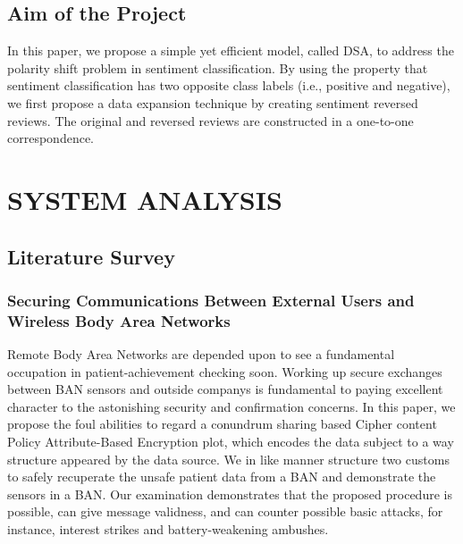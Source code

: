 \documentclass[BTech]{srmuthesis}
\begin{document}
\section{Aim of the Project}
In this paper, we propose a simple yet efficient model, called \ac{DSA}, to address the polarity shift problem in sentiment classification. By using the property that sentiment classification has two opposite class labels (i.e., positive and negative), we first propose a data expansion technique by creating sentiment reversed reviews. The original and reversed reviews are constructed in a one-to-one correspondence.







\chapter{SYSTEM ANALYSIS}

\section{Literature Survey}
\subsection{Securing Communications Between External Users and Wireless Body Area Networks}
Remote Body Area Networks are depended upon to see a fundamental occupation in patient-achievement checking soon. Working up secure exchanges between BAN sensors and outside companys is fundamental to paying excellent character to the astonishing security and confirmation concerns. In this paper, we propose the foul abilities to regard a conundrum sharing based Cipher content Policy Attribute-Based Encryption plot, which encodes the data subject to a way structure appeared by the data source. We in like manner structure two customs to safely recuperate the unsafe patient data from a BAN and demonstrate the sensors in a BAN. Our examination demonstrates that the proposed procedure is possible, can give message validness, and can counter possible basic attacks, for instance, interest strikes and battery-weakening ambushes.
\end{document}
